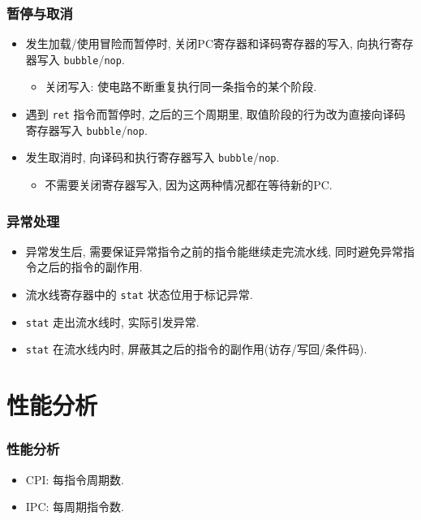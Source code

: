 \documentclass{ctexbeamer}
\newcommand{\ftitle}[1]{\frametitle{\hspace{4ex} {#1}}}
\begin{document}
\begin{frame}
    \ftitle{暂停与取消}
    \begin{itemize}
        \item<2- > 发生加载/使用冒险而暂停时, 关闭PC寄存器和译码寄存器的写入,
              向执行寄存器写入 \texttt{bubble}/\texttt{nop}.
              \begin{itemize}
                  \item<3- > 关闭写入: 使电路不断重复执行同一条指令的某个阶段.
              \end{itemize}
        \item<4- > 遇到 \texttt{ret} 指令而暂停时, 之后的三个周期里,
              取值阶段的行为改为直接向译码寄存器写入 \texttt{bubble}/\texttt{nop}.
        \item<5- > 发生取消时, 向译码和执行寄存器写入 \texttt{bubble}/\texttt{nop}.
              \begin{itemize}
                  \item<6- > 不需要关闭寄存器写入, 因为这两种情况都在等待新的PC.
              \end{itemize}
    \end{itemize}
\end{frame}

\begin{frame}
    \ftitle{异常处理}
    \begin{itemize}
        \item<2- > 异常发生后, 需要保证异常指令之前的指令能继续走完流水线,
              同时避免异常指令之后的指令的副作用.
        \item<3- > 流水线寄存器中的 \texttt{stat} 状态位用于标记异常.
        \item<4- > \texttt{stat} 走出流水线时, 实际引发异常.
        \item<5- > \texttt{stat} 在流水线内时, 屏蔽其之后的指令的副作用(访存/写回/条件码).
    \end{itemize}
\end{frame}

\section{性能分析}
\begin{frame}
    \ftitle{性能分析}
    \begin{itemize}
        \item<2- >$\mathrm{CPI}$: 每指令周期数.
        \item<2- >$\mathrm{IPC}$: 每周期指令数.
    \end{itemize}    

\end{frame}
\end{document}
